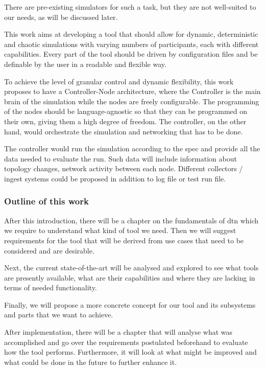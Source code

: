 There are pre-existing simulators for such a task, but they are not well-suited to our needs, as will be discussed later.

This work aims at developing a tool that should allow for dynamic, deterministic and chaotic simulations with varying numbers of participants, each with different capabilities.
Every part of the tool should be driven by configuration files and be definable by the user in a readable and flexible way.

To achieve the level of granular control and dynamic flexibility, this work proposes to have a Controller-Node architecture, where the Controller is the main brain of the simulation while the nodes are freely configurable. The programming of the nodes should be language-agnostic so that they can be programmed on their own, giving them a high degree of freedom. The controller, on the other hand, would orchestrate the simulation and networking that has to be done.

The controller would run the simulation according to the spec and provide all the data needed to evaluate the run. Such data will include information about topology changes, network activity between each node. Different collectors / ingest systems could be proposed in addition to log file or test run file.

\subsubsection{Outline of this work}

After this introduction, there will be a chapter on the fundamentals of \ac{dtn} which we require to understand what kind of tool we need. Then we will suggest requirements for the tool that will be derived from use cases that need to be considered and are desirable.

Next, the current state-of-the-art will be analysed and explored to see what tools are presently available, what are their capabilities and where they are lacking in terms of needed functionality.

Finally, we will propose a more concrete concept for our tool and its subsystems and parts that we want to achieve.

After implementation, there will be a chapter that will analyse what was accomplished and go over the requirements postulated beforehand to evaluate how the tool performs. Furthermore, it will look at what might be improved and what could be done in the future to further enhance it.
